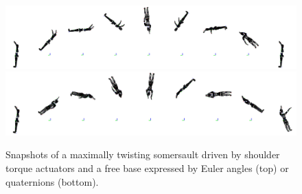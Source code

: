 \begin{figure}[t!]
\centering
\includegraphics[width=\textwidth]{figures/Euler_Bioptim_MaxVrille_dos.png}\\
\vspace*{0.5em}
\includegraphics[width=\textwidth]{figures/Quat_Bioptim_MaxVrille_dos.png}
\caption{Snapshots of a maximally twisting somersault driven by shoulder torque actuators and a free base expressed by Euler angles (top) or quaternions (bottom).}
\label{fig:snapshots_quaternion_base_twisting_somersault}
\end{figure}















